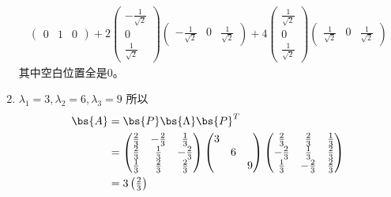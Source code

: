 \documentclass[12pt, a4paper, oneside, UTF8]{ctexbook}
\begin{document}
\begin{solution}
\begin{enumerate}[label=(\arabic*)]
\begin{align*}
\begin{pmatrix}
                0 & 1&0
            \end{pmatrix}+2\begin{pmatrix}
                -\frac{1}{\sqrt{2}}\\
                0\\
                \frac{1}{\sqrt{2}} 
            \end{pmatrix}\begin{pmatrix}
                -\frac{1}{\sqrt{2}} & 0& \frac{1}{\sqrt{2}} 
            \end{pmatrix}+4\begin{pmatrix}
                \frac{1}{\sqrt{2}} \\
                0\\
                \frac{1}{\sqrt{2}} 
            \end{pmatrix}\begin{pmatrix}
                \frac{1}{\sqrt{2}} & 0&\frac{1}{\sqrt{2}} 
            \end{pmatrix}
        \end{align*}
        其中空白位置全是$0$。
        \item $\lambda_1=3,\lambda_2=6,\lambda_3=9$
        所以
        \begin{align*}
            \bs{A}&=\bs{P}\bs{\Lambda}\bs{P}^T\\
            &=\begin{pmatrix}
                \frac{2}{3} & -\frac{2}{3} &\frac{1}{3} \\
                \frac{2}{3} & \frac{1}{3}& -\frac{2}{3}\\
                \frac{1}{3} & \frac{2}{3} &\frac{2}{3}
            \end{pmatrix}
            \begin{pmatrix}
                3 & & \\
                & 6& \\
                & & 9
            \end{pmatrix}
            \begin{pmatrix}
                \frac{2}{3} &\frac{2}{3}&\frac{1}{3} \\
                -\frac{2}{3} & \frac{1}{3}&\frac{2}{3}\\
                \frac{1}{3} & -\frac{2}{3}& \frac{2}{3}
            \end{pmatrix}\\
            &=3\begin{pmatrix}
                \frac{2}{3}  \\

\end{pmatrix}
\end{align*}
\end{enumerate}
\end{solution}
\end{document}
